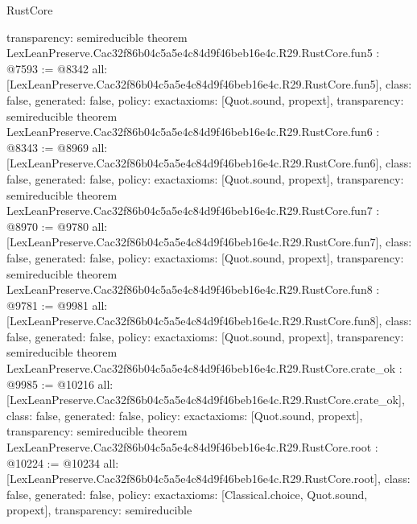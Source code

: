 \begin{lexlean}{RustCore}
\begin{coremodule}
{  transparency: semireducible
}
theorem LexLeanPreserve.Cac32f86b04c5a5e4c84d9f46beb16e4c.R29.RustCore.fun5 : @7593 := @8342 {
  all: [LexLeanPreserve.Cac32f86b04c5a5e4c84d9f46beb16e4c.R29.RustCore.fun5],
  class: false,
  generated: false,
  policy: exact{axioms: [Quot.sound, propext]},
  transparency: semireducible
}
theorem LexLeanPreserve.Cac32f86b04c5a5e4c84d9f46beb16e4c.R29.RustCore.fun6 : @8343 := @8969 {
  all: [LexLeanPreserve.Cac32f86b04c5a5e4c84d9f46beb16e4c.R29.RustCore.fun6],
  class: false,
  generated: false,
  policy: exact{axioms: [Quot.sound, propext]},
  transparency: semireducible
}
theorem LexLeanPreserve.Cac32f86b04c5a5e4c84d9f46beb16e4c.R29.RustCore.fun7 : @8970 := @9780 {
  all: [LexLeanPreserve.Cac32f86b04c5a5e4c84d9f46beb16e4c.R29.RustCore.fun7],
  class: false,
  generated: false,
  policy: exact{axioms: [Quot.sound, propext]},
  transparency: semireducible
}
theorem LexLeanPreserve.Cac32f86b04c5a5e4c84d9f46beb16e4c.R29.RustCore.fun8 : @9781 := @9981 {
  all: [LexLeanPreserve.Cac32f86b04c5a5e4c84d9f46beb16e4c.R29.RustCore.fun8],
  class: false,
  generated: false,
  policy: exact{axioms: [Quot.sound, propext]},
  transparency: semireducible
}
theorem LexLeanPreserve.Cac32f86b04c5a5e4c84d9f46beb16e4c.R29.RustCore.crate_ok : @9985 := @10216 {
  all: [LexLeanPreserve.Cac32f86b04c5a5e4c84d9f46beb16e4c.R29.RustCore.crate_ok],
  class: false,
  generated: false,
  policy: exact{axioms: [Quot.sound, propext]},
  transparency: semireducible
}
theorem LexLeanPreserve.Cac32f86b04c5a5e4c84d9f46beb16e4c.R29.RustCore.root : @10224 := @10234 {
  all: [LexLeanPreserve.Cac32f86b04c5a5e4c84d9f46beb16e4c.R29.RustCore.root],
  class: false,
  generated: false,
  policy: exact{axioms: [Classical.choice, Quot.sound, propext]},
  transparency: semireducible
}


\end{coremodule}
\end{lexlean}
